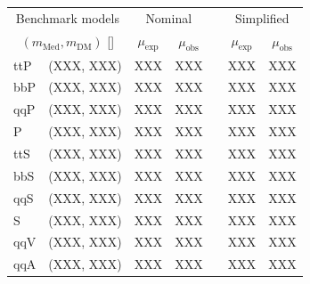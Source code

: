 \begin{table}[!t]
  \label{tab:aggr_limits}
  \centering
  \begin{tabular}{ llccccc }
    \hline
    \multicolumn{2}{c}{Benchmark models}    & \multicolumn{2}{c}{Nominal}
                                            & 
                                            & \multicolumn{2}{c}{Simplified}             \\ [0.3ex]
    \cline{3-4}
    \cline{6-7}
   \multicolumn{2}{c}{$(m_{\text{Med}}, m_{\mathrm{DM}})$ [\GeVns{}]} 
                                            & $\mu_{\text{exp}}$
                                            & $\mu_{\text{obs}}$
                                            & 
                                            & $\mu_{\text{exp}}$
                                            & $\mu_{\text{obs}}$                         \\ [0.3ex]
    \hline
    \multirow{1}{*}{ttP} & (XXX, XXX)  & XXX & XXX &  & XXX & XXX \\
    \multirow{1}{*}{bbP} & (XXX, XXX)  & XXX & XXX &  & XXX & XXX \\
    \multirow{1}{*}{qqP} & (XXX, XXX)  & XXX & XXX &  & XXX & XXX \\
    \multirow{1}{*}{P}   & (XXX, XXX)  & XXX & XXX &  & XXX & XXX \\
    \multirow{1}{*}{ttS} & (XXX, XXX)  & XXX & XXX &  & XXX & XXX \\
    \multirow{1}{*}{bbS} & (XXX, XXX)  & XXX & XXX &  & XXX & XXX \\
    \multirow{1}{*}{qqS} & (XXX, XXX)  & XXX & XXX &  & XXX & XXX \\
    \multirow{1}{*}{S}   & (XXX, XXX)  & XXX & XXX &  & XXX & XXX \\
    \multirow{1}{*}{qqV} & (XXX, XXX)  & XXX & XXX &  & XXX & XXX \\
    \multirow{1}{*}{qqA} & (XXX, XXX)  & XXX & XXX &  & XXX & XXX \\
    \hline
  \end{tabular}
\end{table}


